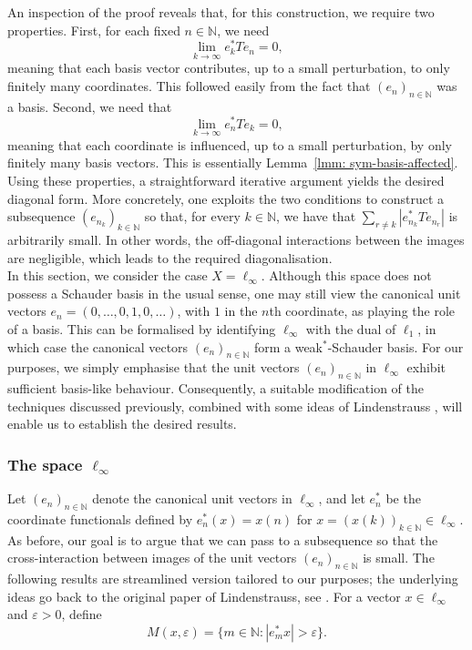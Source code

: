 \documentclass[11pt]{amsart}
\theoremstyle{plain}
\theoremstyle{definition}
\numberwithin{equation}{section}
\newcommand{\N}{\mathbb{N}}
\begin{document}
An inspection of the proof reveals that, for this construction, we require two properties. First, for each fixed $n \in \mathbb{N}$, we need
\begin{equation*}
\lim_{k \to \infty} e_k^* T e_n = 0,
\end{equation*}
meaning that each basis vector contributes, up to a small perturbation, to only finitely many coordinates. This followed easily from the fact that $(e_n)_{n \in \mathbb{N}}$ was a basis. Second, we need that
\begin{equation*}
    \lim_{k \to \infty} e_n^* T e_k = 0,
\end{equation*}
meaning that each coordinate is influenced, up to a small perturbation, by only finitely many basis vectors. This is essentially Lemma~\ref{lmm: sym-basis-affected}. Using these properties, a straightforward iterative argument yields the desired diagonal form. More concretely, one exploits the two conditions to construct a subsequence $(e_{n_k})_{k \in \N}$ so that, for every $k \in \N$, we have that $\sum_{r \not= k} |e^*_{n_k} T e_{n_r}|$ is arbitrarily small. In other words, the off-diagonal interactions between the images are negligible, which leads to the required diagonalisation. \\

In this section, we consider the case $X = \ell_\infty$. Although this space does not possess a Schauder basis in the usual sense, one may still view the canonical unit vectors $e_n = (0, \dots, 0, 1, 0, \dots)$, with $1$ in the $n$th coordinate, as playing the role of a basis. This can be formalised by identifying $\ell_\infty$ with the dual of $\ell_1$, in which case the canonical vectors $(e_n)_{n \in \mathbb{N}}$ form a weak$^*$-Schauder basis. For our purposes, we simply emphasise that the unit vectors $(e_n)_{n \in \N}$ in $\ell_\infty$ exhibit sufficient basis-like behaviour. Consequently, a suitable modification of the techniques discussed previously, combined with some ideas of Lindenstrauss \cite{Lin1967}, will enable us to establish the desired results.

\subsubsection{The space $\ell_\infty$} \label{subsec: l_infty-case-separable} Let $(e_n)_{n \in \N}$ denote the canonical unit vectors in $\ell_\infty$, and let $e_n^*$ be the coordinate functionals defined by $e_n^*(x) = x(n)$ for $x = (x(k))_{k \in \N} \in \ell_\infty$. As before, our goal is to argue that we can pass to a subsequence so that the cross-interaction between images of the unit vectors $(e_n)_{n \in \N}$ is small. The following results are streamlined version tailored to our purposes; the underlying ideas go back to the original paper of Lindenstrauss, see \cite[Proof of Lemma 5]{Lin1967}. For a vector $x\in\ell_\infty$ and $\varepsilon>0$, define
\[
    M(x,\varepsilon)=\{m\in\N: |e_m^*x|>\varepsilon\}.
\]
\end{document}
